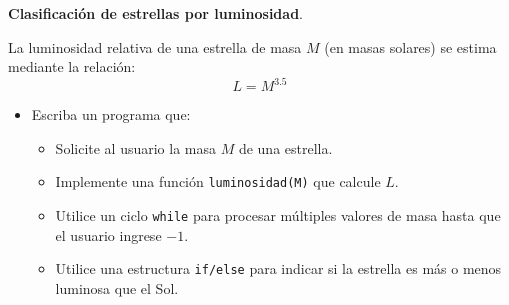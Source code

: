 \item \textbf{Clasificación de estrellas por luminosidad}.

\begin{tcolorbox}[colback=blue!2!white,colframe=blue!55!black,title={Enunciado}]
La luminosidad relativa de una estrella de masa \(M\) (en masas solares) se estima mediante la relación:
\[
L = M^{3.5}
\]

\begin{itemize}
    \item Escriba un programa que:
    \begin{itemize}
        \item Solicite al usuario la masa \(M\) de una estrella.
        \item Implemente una función \texttt{luminosidad(M)} que calcule \(L\).
        \item Utilice un ciclo \texttt{while} para procesar múltiples valores de masa hasta que el usuario ingrese \(-1\).
        \item Utilice una estructura \texttt{if/else} para indicar si la estrella es más o menos luminosa que el Sol.
    \end{itemize}
\end{itemize}
\end{tcolorbox}

